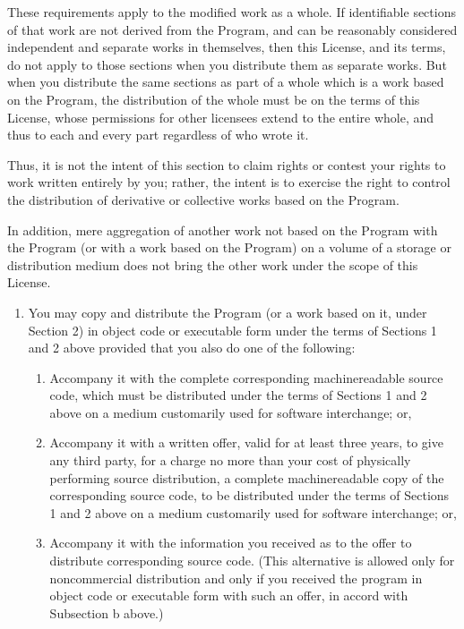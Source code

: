 \documentclass[letterpaper,10pt,english]{sphinxmanual}
\begin{document}
\sphinxAtStartPar
These requirements apply to the modified work as a whole. If identifiable sections of that work are not derived from the Program, and can be reasonably considered independent and separate works in themselves, then this License, and its terms, do not apply to those sections when you distribute them as separate works. But when you distribute the same sections as part of a whole which is a work based on the Program, the distribution of the whole must be on the terms of this License, whose permissions for other licensees extend to the entire whole, and thus to each and every part regardless of who wrote it.

\sphinxAtStartPar
Thus, it is not the intent of this section to claim rights or contest your rights to work written entirely by you; rather, the intent is to exercise the right to control the distribution of derivative or collective works based on the Program.

\sphinxAtStartPar
In addition, mere aggregation of another work not based on the Program with the Program (or with a work based on the Program) on a volume of a storage or distribution medium does not bring the other work under the scope of this License.
\begin{enumerate}
%
\setcounter{enumi}{2}
\item {} 
\sphinxAtStartPar
You may copy and distribute the Program (or a work based on it, under Section 2) in object code or executable form under the terms of Sections 1 and 2 above provided that you also do one of the following:
\begin{enumerate}
%
\item {} 
\sphinxAtStartPar
Accompany it with the complete corresponding machine\sphinxhyphen{}readable source code, which must be distributed under the terms of Sections 1 and 2 above on a medium customarily used for software interchange; or,

\item {} 
\sphinxAtStartPar
Accompany it with a written offer, valid for at least three years, to give any third party, for a charge no more than your cost of physically performing source distribution, a complete machine\sphinxhyphen{}readable copy of the corresponding source code, to be distributed under the terms of Sections 1 and 2 above on a medium customarily used for software interchange; or,

\item {} 
\sphinxAtStartPar
Accompany it with the information you received as to the offer to distribute corresponding source code. (This alternative is allowed only for noncommercial distribution and only if you received the program in object code or executable form with such an offer, in accord with Subsection b above.)

\end{enumerate}

\end{enumerate}
\end{document}
